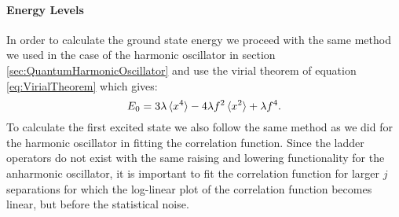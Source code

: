 \documentclass[12pt]{article}
\begin{document}
            \paragraph{Energy Levels}
                In order to calculate the ground state energy we proceed with the same method we used in the case of the harmonic oscillator in section \ref{sec:QuantumHarmonicOscillator} and use the virial theorem of equation \ref{eq:VirialTheorem} which gives:
                \begin{equation}
                    \label{eq:VirialTheoremAnharmonicOsillator}
                    E_0=3\lambda\braket{x^4}-4\lambda f^2\braket{x^2}+\lambda f^4.
                \end{equation}
                To calculate the first excited state we also follow the same method as we did for the harmonic oscillator in fitting the correlation function. Since the ladder operators do not exist with the same raising and lowering functionality for the anharmonic oscillator, it is important to fit the correlation function for larger $j$ separations for which the log-linear plot of the correlation function becomes linear, but before the statistical noise.
\end{document}

